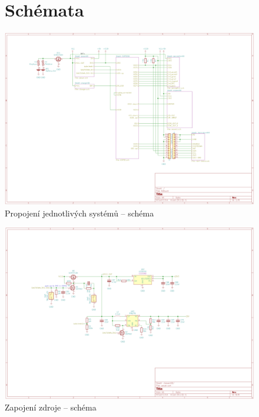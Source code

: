 \begin{figure}
	\section{Schémata}
    \centering
    \includegraphics[width=0.93\textheight, angle=90]{kapitoly/ctvrta_elektronicka_varianta/E4_zapojeni/B.B.pdf}
    \caption{Propojení jednotlivých systémů -- schéma}
    \label{fig:E4-sch_B.B}
\end{figure}
\begin{figure}
    \centering
    \includegraphics[width=0.93\textheight, angle=90]{kapitoly/ctvrta_elektronicka_varianta/E4_zapojeni/zdroj.pdf}
    \caption{Zapojení zdroje -- schéma}
    \label{fig:E4-sch_zdroj}
\end{figure}
